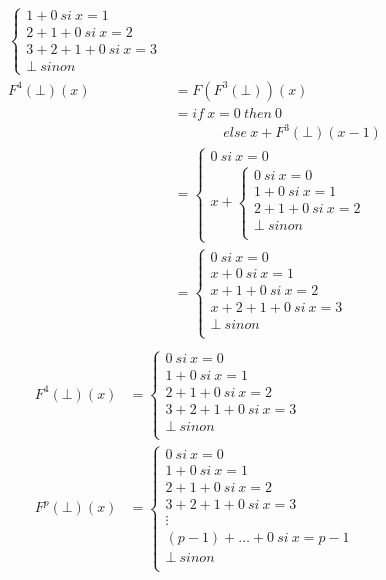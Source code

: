 \documentclass[11pt,a4paper]{article}
\begin{document}
\begin{align*}
\begin{cases}
							1 + 0\ si\ x = 1\\
							2 + 1 + 0\ si\ x = 2\\
							3 + 2 + 1 + 0\ si\ x = 3\\
							\bot\ sinon
						\end{cases}\\	
		F^4(\bot)(x) &= F(F^3(\bot))(x)\\
		&= if\ x = 0\ then\ 0\\
		&\ \ \ \ \ \ \ \ \ \ \ \ \ \ \ \ else\ x + F^3(\bot)(x - 1)\\
		&=	\begin{cases}
				0\ si\ x = 0\\
				x + \begin{cases}
						0\ si\ x = 0\\
						1 + 0\ si\ x = 1\\
						2 + 1 + 0\ si\ x = 2\\
						\bot\ sinon\\
					\end{cases}
			\end{cases}\\
		&=	\begin{cases}
				0\ si\ x = 0\\
				x + 0\ si\ x = 1\\
				x + 1 + 0\ si\ x = 2\\
				x + 2 + 1 + 0\ si\ x = 3\\
				\bot\ sinon\\
			\end{cases}\\
	\end{align*}
	\begin{align*}
	F^4(\bot)(x) &=	\begin{cases}
						0\ si\ x = 0\\
						1 + 0\ si\ x = 1\\
						2 + 1 + 0\ si\ x = 2\\
						3 + 2 + 1 + 0\ si\ x = 3\\
						\bot\ sinon\\
					\end{cases}\\
	F^p(\bot)(x) &=	\begin{cases}
						0\ si\ x = 0\\
						1 + 0\ si\ x = 1\\
						2 + 1 + 0\ si\ x = 2\\
						3 + 2 + 1 + 0\ si\ x = 3\\
						\vdots\\
						(p - 1) + \ldots + 0\ si\ x = p - 1\\
						\bot\ sinon\\
					\end{cases}\\
	\end{align*}
	
\end{document}
